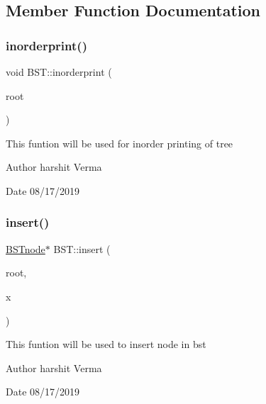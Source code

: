 \subsection{Member Function Documentation}
\mbox{\label{classBST_ada5620d8d4fd050273055ecea1d6f03b}} 
\subsubsection{\texorpdfstring{inorderprint()}{inorderprint()}}
{\footnotesize\ttfamily void B\+S\+T\+::inorderprint (\begin{DoxyParamCaption}\item[{\hyperlink{classBSTnode}{B\+S\+Tnode} $\ast$}]{root }\end{DoxyParamCaption})\hspace{0.3cm}{\ttfamily [inline]}}

This funtion will be used for inorder printing of tree \begin{DoxyAuthor}{Author}
harshit Verma 
\end{DoxyAuthor}
\begin{DoxyDate}{Date}
08/17/2019 
\end{DoxyDate}
\mbox{\label{classBST_af65e88788cd21ab5e64e645cbe541c8c}} 
\subsubsection{\texorpdfstring{insert()}{insert()}}
{\footnotesize\ttfamily \hyperlink{classBSTnode}{B\+S\+Tnode}$\ast$ B\+S\+T\+::insert (\begin{DoxyParamCaption}\item[{\hyperlink{classBSTnode}{B\+S\+Tnode} $\ast$}]{root,  }\item[{int}]{x }\end{DoxyParamCaption})\hspace{0.3cm}{\ttfamily [inline]}}

This funtion will be used to insert node in bst \begin{DoxyAuthor}{Author}
harshit Verma 
\end{DoxyAuthor}
\begin{DoxyDate}{Date}
08/17/2019 
\end{DoxyDate}
\mbox{\label{classBST_a416d136d85763c420f35f5f3dcdb72db}} 
